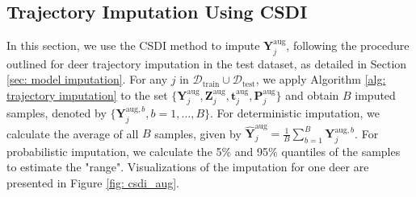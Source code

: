 \documentclass[11pt]{article}
\begin{document}
\subsection{Trajectory Imputation Using CSDI}
In this section, we use the CSDI method to impute $\bm{Y}_j^{\mathrm{aug}}$, following the procedure outlined for deer trajectory imputation in the test dataset, as detailed in Section \ref{sec: model imputation}. For any $j$ in $\mathcal{D}_{\mathrm{train}} \cup \mathcal{D}_{\mathrm{test}}$, we apply Algorithm \ref{alg: trajectory imputation} to the set $\{\bm{Y}_j^{\mathrm{aug}}, \bm{Z}_j^{\mathrm{aug}}, \bm{t}_j^{\mathrm{aug}}, \bm{P}_j^{\mathrm{aug}}\}$ and obtain $B$ imputed samples, denoted by $\{\bm{Y}_j^{\mathrm{aug},b}, b=1,\ldots, B\}$. For deterministic imputation, we calculate the average of all $B$ samples, given by $\hat{\bm{Y}}_j^{\mathrm{aug}} = \frac{1}{B} \sum_{b=1}^B \bm{Y}_j^{\mathrm{aug},b}$. For probabilistic imputation, we calculate the 5\% and 95\% quantiles of the samples to estimate the "range". Visualizations of the imputation for one deer are presented in Figure \ref{fig: csdi_aug}.
\end{document}

